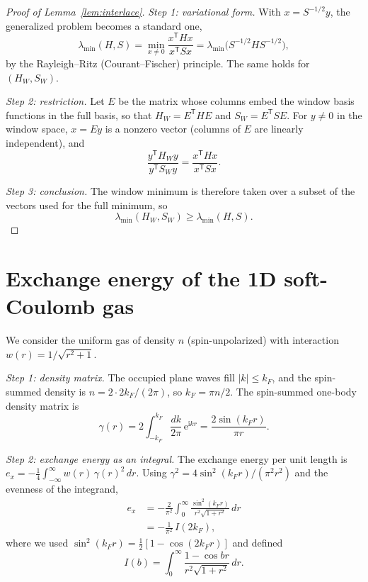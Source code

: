 \documentclass[aps,prb,twocolumn,superscriptaddress,floatfix,longbibliography]{revtex4-2}
\theoremstyle{remark}
\newcommand{\ee}{\mathrm{e}}
\newcommand{\ii}{\mathrm{i}}
\begin{document}
\begin{proof}[Proof of Lemma~\ref{lem:interlace}]
\emph{Step 1: variational form.} With $x=S^{-1/2}y$, the generalized problem becomes a standard one,
\begin{equation}
\lambda_\mathrm{min}(H,S)=\min_{x\neq0}\frac{x^{\mathsf T}Hx}{x^{\mathsf T}Sx}
=\lambda_\mathrm{min}\big(S^{-1/2}HS^{-1/2}\big),
\end{equation}
by the Rayleigh--Ritz (Courant--Fischer) principle. The same holds for $(H_W,S_W)$.

\emph{Step 2: restriction.} Let $E$ be the matrix whose columns embed the window basis functions in the full basis, so
that $H_W=E^{\mathsf T}HE$ and $S_W=E^{\mathsf T}SE$. For $y\neq0$ in the window space, $x=Ey$ is a nonzero vector (columns of
$E$ are linearly independent), and
\begin{equation}
\frac{y^{\mathsf T}H_Wy}{y^{\mathsf T}S_Wy}=\frac{x^{\mathsf T}Hx}{x^{\mathsf T}Sx}.
\end{equation}

\emph{Step 3: conclusion.} The window minimum is therefore taken over a subset of the vectors used for the full minimum, so
\begin{equation}
\lambda_\mathrm{min}(H_W,S_W)\ge\lambda_\mathrm{min}(H,S).
\end{equation}
\end{proof}

\section{Exchange energy of the 1D soft-Coulomb gas}\label{app:ex}

We consider the uniform gas of density $n$ (spin-unpolarized) with interaction $w(r)=1/\sqrt{r^2+1}$.

\emph{Step 1: density matrix.} The occupied plane waves fill $|k|\le k_F$, and the spin-summed density is
$n=2\cdot2k_F/(2\pi)$, so $k_F=\pi n/2$. The spin-summed one-body density matrix is
\begin{equation}
\gamma(r)=2\int_{-k_F}^{k_F}\frac{dk}{2\pi}\,\ee^{\ii kr}=\frac{2\sin(k_Fr)}{\pi r}.
\end{equation}

\emph{Step 2: exchange energy as an integral.} The exchange energy per unit length is
$e_x=-\frac14\int_{-\infty}^{\infty}w(r)\,\gamma(r)^2\,dr$. Using $\gamma^2=4\sin^2(k_Fr)/(\pi^2r^2)$ and the evenness of the integrand,
\begin{align}
e_x&=-\frac{2}{\pi^2}\int_0^\infty\frac{\sin^2(k_Fr)}{r^{2}\sqrt{1+r^2}}\,dr\nonumber\\
&=-\frac{1}{\pi^2}\,I(2k_F),
\end{align}
where we used $\sin^2(k_Fr)=\tfrac12[1-\cos(2k_Fr)]$ and defined
\begin{equation}
I(b)=\int_0^\infty\frac{1-\cos br}{r^2\sqrt{1+r^2}}\,dr .
\end{equation}
\end{document}
